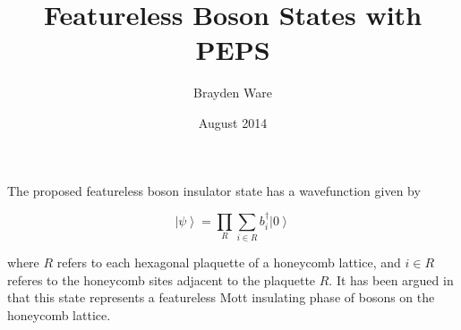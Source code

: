 \documentclass{article}
\title{Featureless Boson States with PEPS}
\author{Brayden Ware}
\date{August 2014}
\newcommand{\ket}[1]{\left |#1 \right \rangle}
\begin{document}
\maketitle


The proposed featureless boson insulator state has a wavefunction given by 

\begin{equation}
\ket{\psi} = \prod\limits_{R} \sum\limits_{i \in R} b^{\dagger}_{i} \ket{0}
\label{eq:def}
\end{equation}

where $R$ refers to each hexagonal plaquette of a honeycomb lattice, and $i \in R$ referes to the honeycomb sites adjacent to the plaquette $R$. It has been argued in  \cite{Kimchi2012-lr} that this state represents a featureless Mott insulating phase of bosons on the honeycomb lattice.
\end{document}
